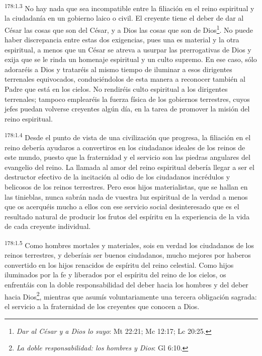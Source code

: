 \par 
\textsuperscript{178:1.3} No hay nada que sea incompatible entre la filiación en el reino espiritual y la ciudadanía en un gobierno laico o civil. El creyente tiene el deber de dar al César las cosas que son del César, y a Dios las cosas que son de Dios\footnote{\textit{Dar al César y a Dios lo suyo}: Mt 22:21; Mc 12:17; Lc 20:25.}. No puede haber discrepancia entre estas dos exigencias, pues una es material y la otra espiritual, a menos que un César se atreva a usurpar las prerrogativas de Dios y exija que se le rinda un homenaje espiritual y un culto supremo. En ese caso, sólo adoraréis a Dios y trataréis al mismo tiempo de iluminar a esos dirigentes terrenales equivocados, conduciéndolos de esta manera a reconocer también al Padre que está en los cielos. No rendiréis culto espiritual a los dirigentes terrenales; tampoco emplearéis la fuerza física de los gobiernos terrestres, cuyos jefes puedan volverse creyentes algún día, en la tarea de promover la misión del reino espiritual.

\par 
\textsuperscript{178:1.4} Desde el punto de vista de una civilización que progresa, la filiación en el reino debería ayudaros a convertiros en los ciudadanos ideales de los reinos de este mundo, puesto que la fraternidad y el servicio son las piedras angulares del evangelio del reino. La llamada al amor del reino espiritual debería llegar a ser el destructor efectivo de la incitación al odio de los ciudadanos incrédulos y belicosos de los reinos terrestres. Pero esos hijos materialistas, que se hallan en las tinieblas, nunca sabrán nada de vuestra luz espiritual de la verdad a menos que os acerquéis mucho a ellos con ese servicio social desinteresado que es el resultado natural de producir los frutos del espíritu en la experiencia de la vida de cada creyente individual.

\par 
\textsuperscript{178:1.5} Como hombres mortales y materiales, sois en verdad los ciudadanos de los reinos terrestres, y deberíais ser buenos ciudadanos, mucho mejores por haberos convertido en los hijos renacidos de espíritu del reino celestial. Como hijos iluminados por la fe y liberados por el espíritu del reino de los cielos, os enfrentáis con la doble responsabilidad del deber hacia los hombres y del deber hacia Dios\footnote{\textit{La doble responsabilidad: los hombres y Dios}: Gl 6:10.}, mientras que asumís voluntariamente una tercera obligación sagrada: el servicio a la fraternidad de los creyentes que conocen a Dios.

